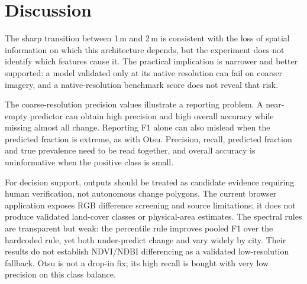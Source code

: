 \documentclass[conference]{IEEEtran}
\begin{document}
\section{Discussion}
The sharp transition between 1\,m and 2\,m is consistent with the loss of spatial
information on which this architecture depends, but the experiment does not
identify which features cause it. The practical implication is narrower and
better supported: a model validated only at its native resolution can fail on
coarser imagery, and a native-resolution benchmark score does not reveal that
risk.

The coarse-resolution precision values illustrate a reporting problem. A
near-empty predictor can obtain high precision and high overall accuracy while
missing almost all change. Reporting F1 alone can also mislead when the
predicted fraction is extreme, as with Otsu. Precision, recall, predicted
fraction and true prevalence need to be read together, and overall accuracy is
uninformative when the positive class is small.

For decision support, outputs should be treated as candidate evidence requiring
human verification, not autonomous change polygons. The current browser
application exposes RGB difference screening and source limitations; it does
not produce validated land-cover classes or physical-area estimates. The
spectral rules are transparent but weak: the percentile rule improves
pooled F1 over the hardcoded rule, yet both under-predict change and vary widely
by city. Their results do not establish NDVI/NDBI differencing as a validated
low-resolution fallback. Otsu is not a drop-in fix; its high recall is bought
with very low precision on this class balance.
\end{document}
